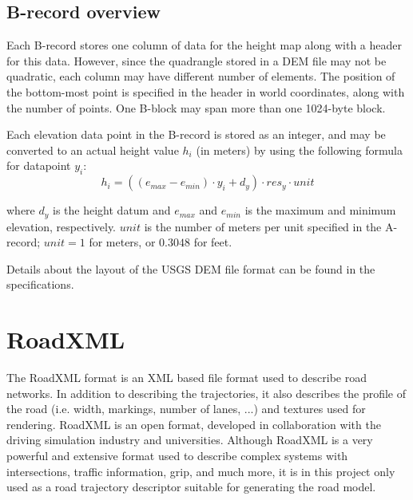 \subsection{B-record overview}
\label{sec:back_brecord}
Each B-record stores one column of data for the height map along with a header for this data. However, since the quadrangle stored in a DEM file may not be quadratic, each column may have different number of elements. The position of the bottom-most point is specified in the header in world coordinates, along with the number of points. One B-block may span more than one 1024-byte block.

Each elevation data point in the B-record is stored as an integer, and may be converted to an actual height value $h_i$ (in meters) by using the following formula for datapoint $y_i$:
$$
h_i = ((e_{max}-e_{min})\cdot y_i+ d_y)\cdot res_y \cdot unit
$$

where $d_y$ is the height datum and $e_{max}$ and $e_{min}$ is the maximum and minimum elevation, respectively. $unit$ is the number of meters per unit specified in the A-record; $unit=1$ for meters, or $0.3048$ for feet.

Details about the layout of the USGS DEM file format can be found in the specifications\cite{usgsdem}.

\section{RoadXML}
The RoadXML format is an XML based file format used to describe road networks. In addition to describing the trajectories, it also describes the profile of the road (i.e. width, markings, number of lanes, ...) and textures used for rendering.\cite{roadxml} RoadXML is an open format, developed in collaboration with the driving simulation industry and universities. Although RoadXML is a very powerful and extensive format used to describe complex systems with intersections, traffic information, grip, and much more, it is in this project only used as a road trajectory descriptor suitable for generating the road model.


